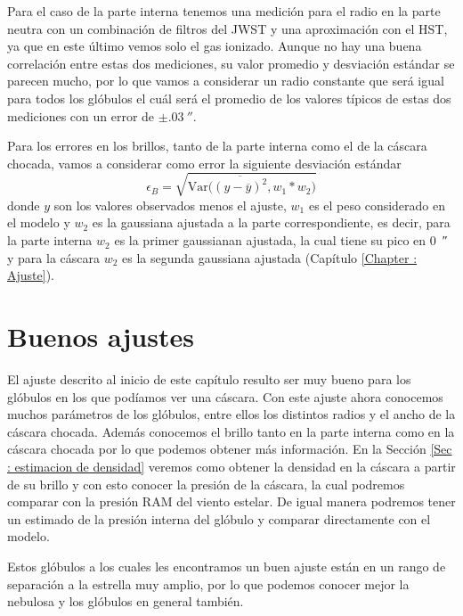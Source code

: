 \documentclass{book}
\begin{document}
Para el caso de la parte interna tenemos una medición para el radio en la parte neutra con un combinación de filtros del JWST y una aproximación con el HST, ya que en este último vemos solo el gas ionizado. Aunque no hay una buena correlación entre estas dos mediciones, su valor promedio y desviación estándar se parecen mucho, por lo que vamos a considerar un radio constante que será igual para todos los glóbulos el cuál será el promedio de los valores típicos de estas dos  mediciones con un error de $\pm\SI{.03}{\arcsecond}$.

Para los errores en los brillos, tanto de la parte interna como el de la cáscara chocada, vamos a considerar como error la siguiente desviación estándar
\[\epsilon_{B}=\sqrt{\mathrm{Var}\Big(\overline{(y-\overline{y})^2},w_1*w_2\Big)}\] 
donde $y$ son los valores observados menos el ajuste, $w_1$ es el peso considerado en el modelo  y $w_2$ es la gaussiana ajustada a la parte correspondiente, es decir, para la parte interna $w_2$ es la primer gaussianan ajustada, la cual tiene su pico en \SI{0}{\arcsecond} y para la cáscara $w_2$ es la segunda gaussiana ajustada (Capítulo \ref{Chapter : Ajuste}). 

\section{Buenos ajustes}\label{Good results}

El ajuste descrito al inicio de este capítulo resulto ser muy bueno para los glóbulos en los que podíamos ver una cáscara. Con este ajuste ahora conocemos muchos parámetros de los glóbulos, entre ellos los distintos radios y el ancho de la cáscara chocada. Además conocemos el brillo tanto en la parte interna como en la cáscara chocada por lo que podemos obtener más información. En la Sección \ref{Sec : estimacion de densidad} veremos como obtener la densidad en la cáscara a partir de su brillo y con esto conocer la presión de la cáscara, la cual podremos comparar con la presión RAM del viento estelar. De igual manera podremos tener un estimado de la presión interna del glóbulo y comparar directamente con el modelo.

Estos glóbulos a los cuales les encontramos un buen ajuste están en un rango de separación a la estrella muy amplio, por lo que podemos conocer mejor la nebulosa y los glóbulos en general también.
\end{document}
